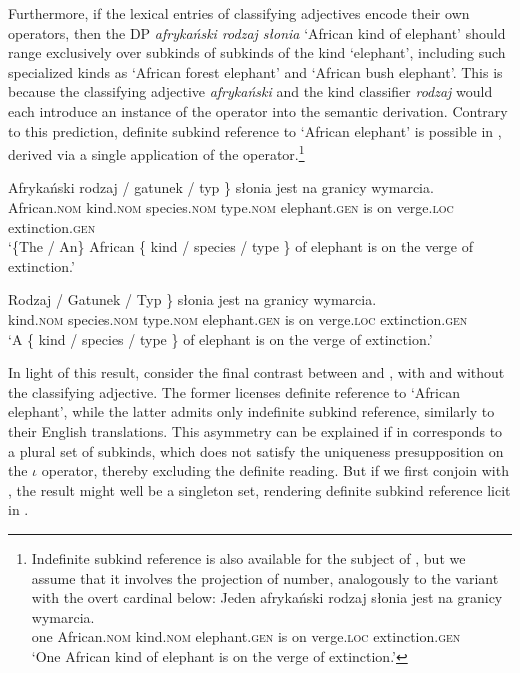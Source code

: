 \documentclass[output=paper]{langscibook}
\begin{document}
\noindent Furthermore, if the lexical entries of classifying adjectives encode their own  operators, then the DP \textit{afrykański rodzaj słonia} `African kind of elephant' should range exclusively over subkinds of subkinds of the kind `elephant', including such specialized kinds as `African forest elephant' and `African bush elephant'. This is because the classifying adjective \textit{afrykański} and the kind classifier \textit{rodzaj} would each introduce an instance of the  operator into the semantic derivation. Contrary to this prediction, definite subkind reference to `African elephant' is possible in , derived via a single application of the  operator.\footnote{Indefinite subkind reference is also available for the subject of , but we assume that it involves the projection of number, analogously to the variant with the overt cardinal below:
\ea
\gll
Jeden afrykański rodzaj słonia jest na granicy wymarcia.\\
one African.\textsc{nom} kind.\textsc{nom} elephant.\textsc{gen} is on verge.\textsc{loc} extinction.\textsc{gen}\\
\glt `One African kind of elephant is on the verge of extinction.'
\z}

\ea \label{ex:attributive_modifier}
\ea \gll
Afrykański \minsp{\{} rodzaj / gatunek / typ \} słonia jest na granicy wymarcia.\\
African.\textsc{nom} {} kind.\textsc{nom} { } species.\textsc{nom} { } type.\textsc{nom} { } elephant.\textsc{gen} is on verge.\textsc{loc} extinction.\textsc{gen}\\
\glt `\{The / An\} African \{ kind / species / type \} of elephant is on the verge of extinction.'
\label{ex:attributive_modifier_1}

\ex \gll
\minsp{\{} Rodzaj / Gatunek / Typ \} słonia jest na granicy wymarcia.\\
{} kind.\textsc{nom} { } species.\textsc{nom} { } type.\textsc{nom} { } elephant.\textsc{gen} is on verge.\textsc{loc} extinction.\textsc{gen}\\
\glt `A \{ kind / species / type \} of elephant is on the verge of extinction.'
\label{ex:attributive_modifier_2}
\z \z

\noindent
In light of this result, consider the final contrast between  and , with and without the classifying adjective. The former licenses definite reference to `African elephant', while the latter admits only indefinite subkind reference, similarly to their English translations. This asymmetry can be explained if  in  corresponds to a plural set of subkinds, which does not satisfy the uniqueness presupposition on the $\iota$ operator, thereby excluding the definite reading. But if we first conjoin  with , the result might well be a singleton set, rendering definite subkind reference licit in .
\end{document}
